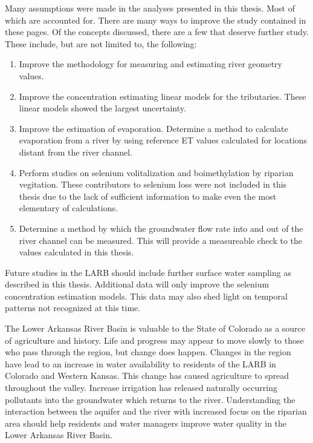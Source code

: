 \begin{linenumbers}
Many assumptions were made in the analyses presented in this thesis.  Most of which are accounted for.  There are many ways to improve the study contained in these pages.  Of the concepts discussed, there are a few that deserve further study.  These include, but are not limited to, the following:
\begin{enumerate}
	\item Improve the methodology for measuring and estimating river geometry values.
	\item Improve the concentration estimating linear models for the tributaries.  These linear models showed the largest uncertainty.
	\item Improve the estimation of evaporation.  Determine a method to calculate evaporation from a river by using reference ET values calculated for locations distant from the river channel.
	\item Perform studies on selenium volitalization and boimethylation by riparian vegitation.  These contributors to selenium loss were not included in this thesis due to the lack of sufficient information to make even the most elementary of calculations.
	\item Determine a method by which the groundwater flow rate into and out of the river channel can be measured.  This will provide a measureable check to the values calculated in this thesis.
\end{enumerate}

Future studies in the LARB should include further surface water sampling as described in this thesis.  Additional data will only improve the selenium concentration estimation models.  This data may also shed light on temporal patterns not recognized at this time.

The Lower Arkansas River Basin is valuable to the State of Colorado as a source of agriculture and history.  Life and progress may appear to move slowly to those who pass through the region, but change does happen.  Changes in the region have lead to an increase in water availability to residents of the LARB in Colorado and Western Kansas.  This change has caused agriculture to spread throughout the valley.  Increase irrigation has released naturally occurring pollutants into the groundwater which returns to the river.  Understanding the interaction between the aquifer and the river with increased focus on the riparian area should help residents and water managers improve water quality in the Lower Arkansas River Basin.

\clearpage{}
\end{linenumbers}